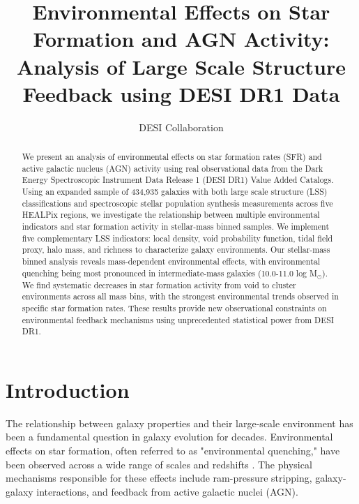 \documentclass[twocolumn]{aastex701}
\begin{document}
\title{Environmental Effects on Star Formation and AGN Activity: Analysis of Large Scale Structure Feedback using DESI DR1 Data}

\author{DESI Collaboration}

\begin{abstract}
We present an analysis of environmental effects on star formation rates (SFR) and active galactic nucleus (AGN) activity using real observational data from the Dark Energy Spectroscopic Instrument Data Release 1 (DESI DR1) Value Added Catalogs. Using an expanded sample of 434,935 galaxies with both large scale structure (LSS) classifications and spectroscopic stellar population synthesis measurements across five HEALPix regions, we investigate the relationship between multiple environmental indicators and star formation activity in stellar-mass binned samples. We implement five complementary LSS indicators: local density, void probability function, tidal field proxy, halo mass, and richness to characterize galaxy environments. Our stellar-mass binned analysis reveals mass-dependent environmental effects, with environmental quenching being most pronounced in intermediate-mass galaxies (10.0-11.0 log M$_\odot$). We find systematic decreases in star formation activity from void to cluster environments across all mass bins, with the strongest environmental trends observed in specific star formation rates. These results provide new observational constraints on environmental feedback mechanisms using unprecedented statistical power from DESI DR1.
\end{abstract}


\section{Introduction}

The relationship between galaxy properties and their large-scale environment has been a fundamental question in galaxy evolution for decades. Environmental effects on star formation, often referred to as "environmental quenching," have been observed across a wide range of scales and redshifts \citep{Dressler1980, Peng2010, Wetzel2012}. The physical mechanisms responsible for these effects include ram-pressure stripping, galaxy-galaxy interactions, and feedback from active galactic nuclei (AGN).
\end{document}
